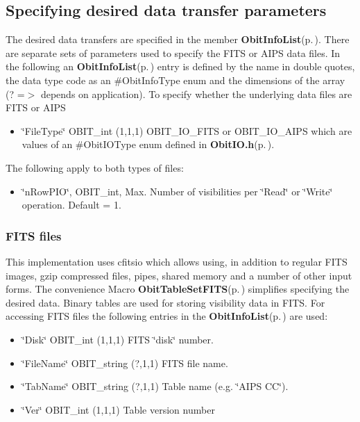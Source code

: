 \subsection{Specifying desired data transfer parameters}\label{ObitTable_8h_ObitTableSpecification}
The desired data transfers are specified in the member {\bf Obit\-Info\-List}{\rm (p.\,\pageref{structObitInfoList})}. There are separate sets of parameters used to specify the FITS or AIPS data files. In the following an {\bf Obit\-Info\-List}{\rm (p.\,\pageref{structObitInfoList})} entry is defined by the name in double quotes, the data type code as an \#Obit\-Info\-Type enum and the dimensions of the array (? =$>$ depends on application). To specify whether the underlying data files are FITS or AIPS \begin{itemize}
\item \char`\"{}File\-Type\char`\"{} OBIT\_\-int (1,1,1) OBIT\_\-IO\_\-FITS or OBIT\_\-IO\_\-AIPS which are values of an \#Obit\-IOType enum defined in {\bf Obit\-IO.h}{\rm (p.\,\pageref{ObitIO_8h})}.\end{itemize}
The following apply to both types of files: \begin{itemize}
\item \char`\"{}n\-Row\-PIO\char`\"{}, OBIT\_\-int, Max. Number of visibilities per \char`\"{}Read\char`\"{} or \char`\"{}Write\char`\"{} operation. Default = 1.\end{itemize}
\subsubsection{FITS files}\label{ObitTableWX_8h_TableFITS}
This implementation uses cfitsio which allows using, in addition to regular FITS images, gzip compressed files, pipes, shared memory and a number of other input forms. The convenience Macro {\bf Obit\-Table\-Set\-FITS}{\rm (p.\,\pageref{ObitTable_8h_a6})} simplifies specifying the desired data. Binary tables are used for storing visibility data in FITS. For accessing FITS files the following entries in the {\bf Obit\-Info\-List}{\rm (p.\,\pageref{structObitInfoList})} are used: \begin{itemize}
\item \char`\"{}Disk\char`\"{} OBIT\_\-int (1,1,1) FITS \char`\"{}disk\char`\"{} number. \item \char`\"{}File\-Name\char`\"{} OBIT\_\-string (?,1,1) FITS file name. \item \char`\"{}Tab\-Name\char`\"{} OBIT\_\-string (?,1,1) Table name (e.g. \char`\"{}AIPS CC\char`\"{}). \item \char`\"{}Ver\char`\"{} OBIT\_\-int (1,1,1) Table version number\end{itemize}
